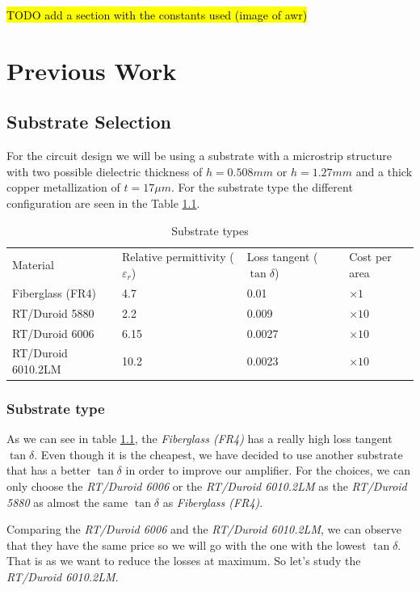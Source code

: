 \documentclass[12pt]{report} %
\newcommand{\todo}[1]{\sethlcolor{green}\hl{TODO #1}}
\let\oldsection\section
\renewcommand\section{\clearpage\oldsection}
\begin{document}
\todo{add a section with the constants used (image of awr)}


\chapter{Previous Work}
\section{Substrate Selection}

For the circuit design we will be using a substrate with a microstrip structure with two possible dielectric thickness of $h = 0.508 mm$ or $h = 1.27 mm$ and a thick copper metallization of $t = 17 \mu m$. For the substrate type the different configuration are seen in the Table \ref{tab:previous_work:substrate_types}.

\begin{table}[htbp]
    \centering
    \caption{Substrate types}
    \label{tab:previous_work:substrate_types}
    \begin{tabular}{@{}llll@{}}
    Material & Relative permittivity ($\varepsilon_r$) & Loss tangent ($\tan \delta$) & Cost per area \\
    Fiberglass (FR4) & 4.7 & 0.01 & $\times 1$ \\
    RT/Duroid 5880 & 2.2 & 0.009 & $\times 10$ \\
    RT/Duroid 6006 & 6.15 & 0.0027 & $\times 10$ \\
    RT/Duroid 6010.2LM & 10.2 & 0.0023 & $\times 10$ \\
    \end{tabular}
\end{table}

\subsection{Substrate type}

As we can see in table \ref{tab:previous_work:substrate_types}, the \textit{Fiberglass (FR4)} has a really high loss tangent $\tan \delta$. Even though it is the cheapest, we have decided to use another substrate that has a better $\tan \delta$ in order to improve our amplifier. For the choices, we can only choose the \textit{RT/Duroid 6006} or the \textit{RT/Duroid 6010.2LM} as the \textit{RT/Duroid 5880} as almost the same $\tan \delta$ as \textit{Fiberglass (FR4)}.

Comparing the  \textit{RT/Duroid 6006} and the \textit{RT/Duroid 6010.2LM}, we can observe that they have the same price so we will go with the one with the lowest $\tan \delta$. That is as we want to reduce the losses at maximum. So let's study the \textit{RT/Duroid 6010.2LM}. 
\end{document}
